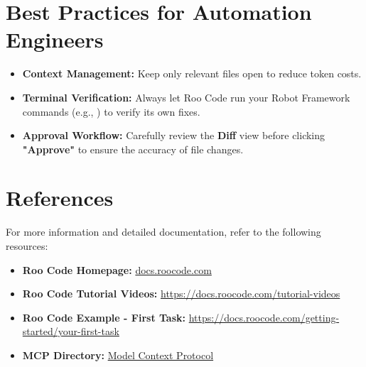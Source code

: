 \section{Best Practices for Automation Engineers}
\begin{itemize}
   \item \textbf{Context Management:}
      Keep only relevant files open to reduce token costs.
   \item \textbf{Terminal Verification:}
      Always let Roo Code run your Robot Framework commands
      (e.g., ) to verify its own fixes.
   \item \textbf{Approval Workflow:}
      Carefully review the \textbf{Diff} view before clicking \textbf{"Approve"}
      to ensure the accuracy of file changes.
\end{itemize}

\section{References}
For more information and detailed documentation,
refer to the following resources:
\begin{itemize}
   \item \textbf{Roo Code Homepage:}
      \href{https://docs.roocode.com/}{docs.roocode.com}
   \item \textbf{Roo Code Tutorial Videos:}
      \href{https://docs.roocode.com/tutorial-videos}
      {https://docs.roocode.com/tutorial-videos}
   \item \textbf{Roo Code Example - First Task:}
      \href{https://docs.roocode.com/getting-started/your-first-task}
      {https://docs.roocode.com/getting-started/your-first-task}
   \item \textbf{MCP Directory:}
      \href{https://modelcontextprotocol.io/}{Model Context Protocol}
\end{itemize}
